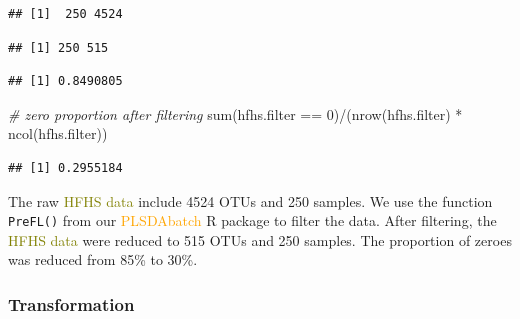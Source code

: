 \documentclass[
]{book}
\newenvironment{Shaded}{\begin{snugshade}}{\end{snugshade}}
\newcommand{\AttributeTok}[1]{\textcolor[rgb]{0.77,0.63,0.00}{#1}}
\newcommand{\CommentTok}[1]{\textcolor[rgb]{0.56,0.35,0.01}{\textit{#1}}}
\newcommand{\DecValTok}[1]{\textcolor[rgb]{0.00,0.00,0.81}{#1}}
\newcommand{\FunctionTok}[1]{\textcolor[rgb]{0.00,0.00,0.00}{#1}}
\newcommand{\NormalTok}[1]{#1}
\newcommand{\OtherTok}[1]{\textcolor[rgb]{0.56,0.35,0.01}{#1}}
\newcommand{\SpecialCharTok}[1]{\textcolor[rgb]{0.00,0.00,0.00}{#1}}
\begin{document}
\begin{verbatim}
## [1]  250 4524
\end{verbatim}

\begin{Shaded}
\end{Shaded}

\begin{verbatim}
## [1] 250 515
\end{verbatim}

\begin{Shaded}
\end{Shaded}

\begin{verbatim}
## [1] 0.8490805
\end{verbatim}

\begin{Shaded}
\begin{Highlighting}[]
\CommentTok{\# zero proportion after filtering}
\FunctionTok{sum}\NormalTok{(hfhs.filter }\SpecialCharTok{==} \DecValTok{0}\NormalTok{)}\SpecialCharTok{/}\NormalTok{(}\FunctionTok{nrow}\NormalTok{(hfhs.filter) }\SpecialCharTok{*} \FunctionTok{ncol}\NormalTok{(hfhs.filter))}
\end{Highlighting}
\end{Shaded}

\begin{verbatim}
## [1] 0.2955184
\end{verbatim}

The raw \textcolor{olive}{HFHS data} include 4524 OTUs and 250 samples. We use the function \texttt{PreFL()} from our \textcolor{orange}{PLSDAbatch} R package to filter the data. After filtering, the \textcolor{olive}{HFHS data} were reduced to 515 OTUs and 250 samples. The proportion of zeroes was reduced from 85\% to 30\%.

\hypertarget{transformation-2}{%
\subsubsection{Transformation}\label{transformation-2}}
\end{document}
